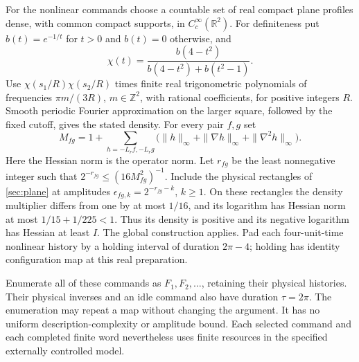 \documentclass[11pt]{article}
\numberwithin{equation}{section}
\theoremstyle{definition}
\newcommand{\R}{\mathbb R}
\begin{document}
For the nonlinear commands choose a countable set of real compact plane profiles dense, with common compact supports, in $C_c^\infty(\R^2)$. For definiteness put $b(t)=e^{-1/t}$ for $t>0$ and $b(t)=0$ otherwise, and
\[
 \chi(t)=\frac{b(4-t^2)}{b(4-t^2)+b(t^2-1)}.
\]
Use $\chi(s_1/R)\chi(s_2/R)$ times finite real trigonometric polynomials of frequencies $\pi m/(3R)$, $m\in\mathbb Z^2$, with rational coefficients, for positive integers $R$. Smooth periodic Fourier approximation on the larger square, followed by the fixed cutoff, gives the stated density. For every pair $f,g$ set
\[
 M_{fg}=1+\sum_{h=-L_rf,-L_rg}
    \bigl(\|h\|_\infty+\|\nabla h\|_\infty+\|\nabla^2h\|_\infty\bigr).
\]
Here the Hessian norm is the operator norm. Let $r_{fg}$ be the least nonnegative integer such that $2^{-r_{fg}}\le(16M_{fg}^2)^{-1}$. Include the physical rectangles of \cref{sec:plane} at amplitudes $\epsilon_{fg,k}=2^{-r_{fg}-k}$, $k\ge1$. On these rectangles the density multiplier differs from one by at most $1/16$, and its logarithm has Hessian norm at most $1/15+1/225<1$. Thus its density is positive and its negative logarithm has Hessian at least $I$. The global construction applies. Pad each four-unit-time nonlinear history by a holding interval of duration $2\pi-4$; holding has identity configuration map at this real preparation.

Enumerate all of these commands as $F_1,F_2,\ldots$, retaining their physical histories. Their physical inverses and an idle command also have duration $\tau=2\pi$. The enumeration may repeat a map without changing the argument. It has no uniform description-complexity or amplitude bound. Each selected command and each completed finite word nevertheless uses finite resources in the specified externally controlled model.
\end{document}
